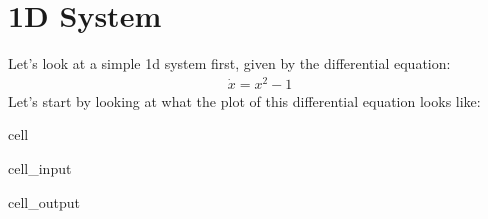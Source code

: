 \documentclass[letterpaper,10pt,english]{jupyterBook}
\begin{document}
\section{1D System}
\label{\detokenize{content/1_mechanics/dynamical_1:d-system}}
\sphinxAtStartPar
Let’s look at a simple 1d system first, given by the differential equation:
\begin{equation*}
\begin{split}
\dot{x} = x^2 - 1
\end{split}
\end{equation*}
\sphinxAtStartPar
Let’s start by looking at what the plot of this differential equation looks like:

\begin{sphinxuseclass}{cell}\begin{sphinxVerbatimInput}

\begin{sphinxuseclass}{cell_input}
\begin{sphinxVerbatim}[commandchars=\\\{\}]
   
   
  
    
 
 
\end{sphinxVerbatim}

\end{sphinxuseclass}\end{sphinxVerbatimInput}
\begin{sphinxVerbatimOutput}

\begin{sphinxuseclass}{cell_output}
\noindent{}

\end{sphinxuseclass}\end{sphinxVerbatimOutput}

\end{sphinxuseclass}
\end{document}
